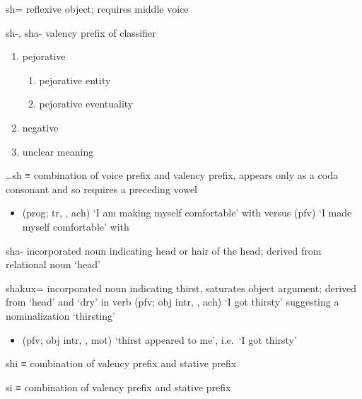 \documentclass[12pt,letterpaper,oneside,article]{memoir}
\begin{document}
\begin{morphdesc}[resume*=alphalist]
\item[sh=]
	reflexive object;
	requires middle voice 

\item[sh-, sha-]
	valency prefix of classifier
	\begin{enumerate}
	\item	pejorative
		\begin{enumerate}
		\item	pejorative entity
		\item	pejorative eventuality
		\end{enumerate}
	\item	negative
	\item	unclear meaning
	\end{enumerate}

\item[…sh]
	≡ 
	combination of  voice prefix
		and  valency prefix,
	appears only as a coda consonant and so requires a preceding vowel
	\begin{itemize}
	\item	{} (prog; tr, , ach) ‘I am making myself comfortable’
			with \newline
		versus  (pfv) ‘I made myself comfortable’
			with 
	\end{itemize}

\item[sha-]
	incorporated noun indicating head or hair of the head;
	derived from relational noun  ‘head’

\item[shakux=]
	incorporated noun indicating thirst,
	saturates object argument;
	derived from  ‘head’ and  ‘dry’
		in verb  (pfv; obj intr, , ach) ‘I got thirsty’
		suggesting a nominalization  ‘thirsting’
	\begin{itemize}
	\item	{} (pfv; obj intr, , mot) ‘thirst appeared to me’,
		i.e.\ ‘I got thirsty’
		\parencite[01/11]{leer:1973}
	\end{itemize}

\item[shi]
	≡ 
	combination of  valency prefix
		and  stative prefix

\item[si]
	≡ 
	combination of  valency prefix
		and  stative prefix
\end{morphdesc}
\end{document}
